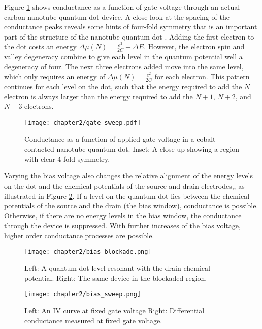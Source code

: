 Figure \ref{fig:real_gate} shows conductance as a function of gate voltage through an actual carbon nanotube quantum dot device. A close look at the spacing of the conductance peaks reveals some hints of four-fold symmetry that is an important part of the structure of the nanotube quantum dot \cite{Cobden2002}. Adding the first electron to the dot costs an energy $ \Delta \mu(N) = \frac{e^2}{2C} + \Delta E$. However, the electron spin and valley degeneracy combine to give each level in the quantum potential well a degeneracy of four. The next three electrons added move into the same level, which only requires an energy of $\Delta \mu(N) = \frac{e^2}{2C}$ for each electron. This pattern continues for each level on the dot, such that the energy required to add the $N$ electron is always larger than the energy required to add the $N+1$, $N+2$, and $N+3$ electrons.

\begin{figure}
    \centering
    \texttt{[image: chapter2/gate\_sweep.pdf]}
    \caption{Conductance as a function of applied gate voltage in a cobalt contacted nanotube quantum dot. Inset: A close up showing a region with clear 4 fold symmetry.}
    \label{fig:real_gate}
\end{figure}

Varying the bias voltage also changes the relative alignment of the energy levels on the dot and the chemical potentials of the source and drain electrodes,, as illustrated in Figure \ref{fig:bias_blockade}. If a level on the quantum dot lies between the chemical potentials of the source and the drain (the bias window), conductance is possible. Otherwise, if there are no energy levels in the bias window, the conductance through the device is suppressed. With further increases of the bias voltage, higher order conductance processes are possible. 

\begin{figure}
    \centering
    \texttt{[image: chapter2/bias\_blockade.png]}
    \caption{Left: A quantum dot level resonant with the drain chemical potential. Right: The same device in the blockaded region.}
    \label{fig:bias_blockade}
\end{figure}

\begin{figure}
    \centering
    \texttt{[image: chapter2/bias\_sweep.png]}
    \caption{Left: An IV curve at fixed gate voltage Right: Differential conductance measured at fixed gate voltage.}
    \label{fig:real_bias}
\end{figure}

